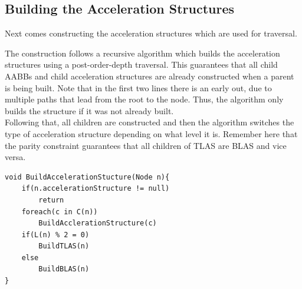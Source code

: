 \subsection{Building the Acceleration Structures}
\label{sec:TraversalTreeBuild}
Next comes constructing the acceleration structures which are used for traversal.

The construction follows a recursive algorithm which builds the acceleration structures using a post-order-depth traversal. This guarantees that all child AABBs and child acceleration structures are already constructed when a parent is being built. Note that in the first two lines there is an early out, due to multiple paths that lead from the root to the node. Thus, the algorithm only builds the structure if it was not already built.\\
Following that, all children are constructed and then the algorithm switches the type of acceleration structure depending on what level it is. Remember here that the parity constraint guarantees that all children of TLAS are BLAS and vice versa.\\
\begin{lstlisting}
void BuildAccelerationStucture(Node n){
    if(n.accelerationStructure != null)
        return
    foreach(c in C(n))
        BuildAcclerationStructure(c)
    if(L(n) % 2 = 0)
        BuildTLAS(n)
    else
        BuildBLAS(n)
}
\end{lstlisting}

